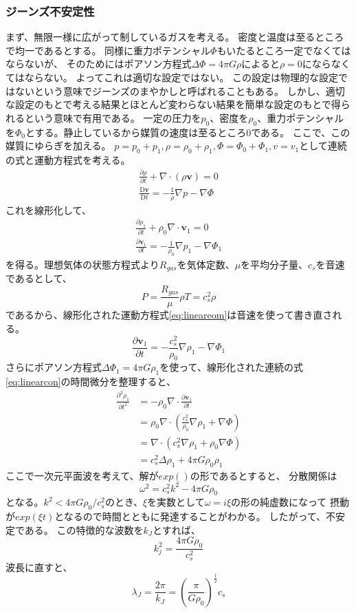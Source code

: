 \documentclass{jsarticle}
\newcommand{\bv}{\mathbf{v}}
\newcommand{\pder}[2][]{\frac{\partial#1}{\partial#2}}
\newcommand{\ppder}[2][]{\frac{\partial^2#1}{\partial#2^2}}
\newcommand{\Dder}[2][]{\frac{\mathrm{D}#1}{\mathrm{D}#2}}
\newcommand{\half}{\frac{1}{2}}
\newcommand{\beq}{\begin{equation}}
\newcommand{\eeq}{\end{equation}}
\begin{document}
\subsubsection{ジーンズ不安定性}
まず、無限一様に広がって制しているガスを考える。
密度と温度は至るところで均一であるとする。
同様に重力ポテンシャル$\Phi$もいたるところ一定でなくてはならないが、
そのためにはポアソン方程式$\Delta \Phi = 4 \pi G \rho$によると$\rho=0$にならなくてはならない。
よってこれは適切な設定ではない。
この設定は物理的な設定ではないという意味でジーンズのまやかしと呼ばれることもある。
しかし、適切な設定のもとで考える結果とほとんど変わらない結果を簡単な設定のもとで得られるという意味で有用である。
一定の圧力を$p_0$、密度を$\rho_0$、重力ポテンシャルを$\Phi_0$とする。静止しているから媒質の速度は至るところ$0$である。
ここで、この媒質にゆらぎを加える。
$p = p_0 + p_1,\rho = \rho_0 + \rho_1,\Phi = \Phi_0 + \Phi_1, v = v_1$として連続の式と運動方程式を考える。
\begin{align}
    \pder[\rho]{t} + \nabla \cdot (\rho \bv) = 0\label{eq:linearcon}
\\
    \Dder[\bv]{t} = - \frac{1}{\rho}\nabla p - \nabla \Phi\label{eq:lineareom}
\end{align}
これを線形化して、
\begin{align}
    \pder[\rho_1]{t} + \rho_0\nabla \cdot \bv_1 = 0\\
    \pder[\bv_1]{t} = - \frac{1}{\rho_0}\nabla p_1 - \nabla \Phi_1
\end{align}
を得る。理想気体の状態方程式より$R_{gas}$を気体定数、$\mu$を平均分子量、$c_s$を音速であるとして、
\beq
P = \frac{R_{gas}}{\mu} \rho T = c_s^2 \rho
\eeq
であるから、線形化された運動方程式\eqref{eq:lineareom}は音速を使って書き直される。
\beq
    \pder[\bv_1]{t} = - \frac{c_s^2}{\rho_0}\nabla \rho_1 - \nabla \Phi_1
\eeq
さらにポアソン方程式$\Delta \Phi_1 = 4 \pi G\rho_1$を使って、線形化された連続の式\eqref{eq:linearcon}の時間微分を整理すると、
\begin{align}
    \ppder[\rho_1]{t} &= - \rho_0 \nabla \cdot \pder[\bv_1]{t}\\
                      &= \rho_0 \nabla \cdot \left(\frac{c_s^2}{\rho_0}\nabla \rho_1 + \nabla \Phi\right)\\
                      &= \nabla \cdot \left(c_s^2\nabla \rho_1 + \rho_0\nabla \Phi\right)\\
                      &= c_s^2\Delta\rho_1 + 4\pi G\rho_0\rho_1
\end{align}
ここで一次元平面波を考えて、解が$exp()$の形であるとすると、
分散関係は
\beq
    \omega^2 = c_s^2k^2 - 4\pi G \rho_0
\eeq
となる。$k^2 < 4 \pi G\rho_0 / c_s^2$のとき、$\xi$を実数として$\omega = i \xi$の形の純虚数になって
摂動が$exp(\xi t)$となるので時間とともに発達することがわかる。
したがって、不安定である。
この特徴的な波数を$k_J$とすれば、
\beq
k_j^2 = \frac{4\pi G \rho_0}{c_s^2}
\eeq
波長に直すと、
\beq
\lambda_J = \frac{2\pi}{k_J} = \left(\frac{\pi}{G\rho_0} \right)^\half c_s
\eeq
\end{document}
